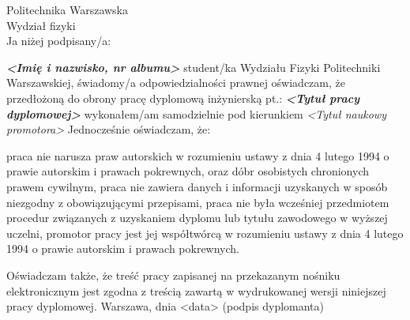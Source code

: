 \setcounter{page}{7}
\vspace{-1.5cm}
\begin{flushleft}
	Politechnika Warszawska \\ 
	Wydział fizyki \\
	\vspace{0.5cm}
	Ja niżej podpisany/a: 
\end{flushleft}
\center \textit{\textbf{<Imię i nazwisko, nr albumu>}} %
\justify student/ka Wydziału Fizyki Politechniki Warszawskiej, świadomy/a odpowiedzialności prawnej oświadczam, że przedłożoną do obrony pracę dyplomową inżynierską pt.:
\center \textit{\textbf{<Tytuł pracy dyplomowej>}} %
\justify wykonałem/am samodzielnie pod kierunkiem
\center \textit{<Tytuł naukowy promotora>} %
\justify Jednocześnie oświadczam, że: \\
\begin{itemize}
	\itemi praca nie narusza praw autorskich w rozumieniu ustawy z dnia 4 lutego 1994 o prawie autorskim i prawach pokrewnych, oraz dóbr osobistych chronionych prawem cywilnym,
	\itemi praca nie zawiera danych i informacji uzyskanych w sposób niezgodny z obowiązującymi przepisami,
	\itemi praca nie była wcześniej przedmiotem procedur związanych z uzyskaniem dyplomu lub tytułu zawodowego w wyższej uczelni,
	\itemi promotor pracy jest jej współtwórcą w rozumieniu ustawy z dnia 4 lutego 1994 o prawie autorskim i prawach pokrewnych.
\end{itemize}
\justify Oświadczam także, że treść pracy zapisanej na przekazanym nośniku elektronicznym jest zgodna z treścią zawartą w wydrukowanej wersji niniejszej pracy dyplomowej.
\vfill
Warszawa, dnia <data> \hfill (podpis dyplomanta) %

\newpage
\thispagestyle{empty}
\phantom{Nothing here}
\newpage
\clearpage
\phantom{Here neither}

